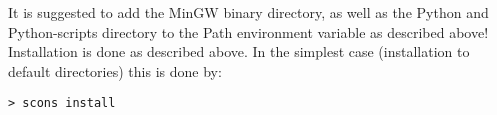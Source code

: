 It is suggested to add the MinGW binary directory, as well as the Python and Python-scripts directory
to the Path environment variable as described above! Installation is done as described above. 
In the simplest case (installation to default directories) this is done by:

\begin{verbatim}
> scons install
\end{verbatim}

